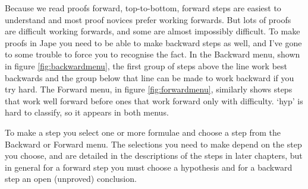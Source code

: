 \documentclass[11pt]{book}
\newcommand{\figref}[1]{figure \ref{fig:#1}}
\begin{document}
Because we read proofs forward, top-to-bottom, forward steps are easiest to understand and most proof novices prefer working forwards. But lots of proofs are difficult working forwards, and some are almost impossibly difficult. To make proofs in Jape you need to be able to make backward steps as well, and I've gone to some trouble to force you to recognise the fact. In the Backward menu, shown in \figref{backwardmenu}, the first group of steps above the line work best backwards and the group below that line can be made to work backward if you try hard. The Forward menu, in \figref{forwardmenu}, similarly shows steps that work well forward before ones that work forward only with difficulty. `hyp' is hard to classify, so it appears in both menus.

To make a step you select one or more formulae and choose a step from the Backward or Forward menu. The selections you need to make depend on the step you choose, and are detailed in the descriptions of the steps in later chapters, but in general for a forward step you must choose a hypothesis and for a backward step an open (unproved) conclusion.
\end{document}
